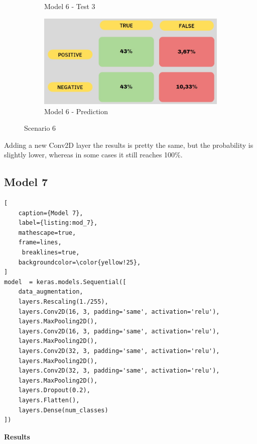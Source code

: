 \documentclass[a4paper,12pt]{article}
\begin{document}
\begin{figure}
\begin{subfigure}{6cm}
        \caption{ Model 6 - Test 3}
    \end{subfigure}
     \begin{subfigure}{6cm}
        \includegraphics[width=\linewidth]{images_latex/model6.jpg}
        \caption{ Model 6 - Prediction}
    \end{subfigure}
    \caption{Scenario 6}%
\end{figure}

Adding a new Conv2D layer the results is pretty the same, but the probability is slightly lower, whereas in some cases it still reaches 100\%. 
\newpage
\subsection{Model 7}
\begin{lstlisting}[
    caption={Model 7},
    label={listing:mod_7},
    mathescape=true, 
    frame=lines,
     breaklines=true,
    backgroundcolor=\color{yellow!25},
]
model  = keras.models.Sequential([
    data_augmentation,
    layers.Rescaling(1./255),
    layers.Conv2D(16, 3, padding='same', activation='relu'),
    layers.MaxPooling2D(),
    layers.Conv2D(16, 3, padding='same', activation='relu'),
    layers.MaxPooling2D(),
    layers.Conv2D(32, 3, padding='same', activation='relu'),
    layers.MaxPooling2D(),
    layers.Conv2D(32, 3, padding='same', activation='relu'),
    layers.MaxPooling2D(),
    layers.Dropout(0.2),
    layers.Flatten(),
    layers.Dense(num_classes)
])
\end{lstlisting}

\textbf{Results}
\end{document}
